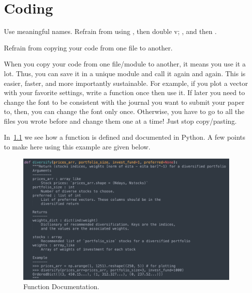 \chapter{Coding}
\label{chap:Coding}



\begin{rem}
Use meaningful names. Refrain from 
using , then double v; ,
and then .
\end{rem}


\begin{rem}
Refrain from copying your code from
one file to another.
\end{rem}
\noindent When you copy your code from one file/module
to another, it means you use it a lot. Thus, you can
save it in a unique module and call it again and again.
This is easier, faster, and more importantly sustainable.
For example, if you plot a vector with your favorite settings,
write a function once then use it. If later you need
to change the font to be consistent with
the journal you want to submit your paper to, then, you can
change the font only once. Otherwise, you have to go to
all the files you wrote before and change them one at a time!
Just stop copy/pasting.

In~\cref{fig:FunctionDocumentation} we see how a function is defined
and documented in Python.
A few points to make here using this example are given below.
\begin{figure}
  \centering
  \includegraphics[width=1\textwidth]{figures/function_documentation}
  \caption{Function Documentation.}
  \label{fig:FunctionDocumentation}
\end{figure}


